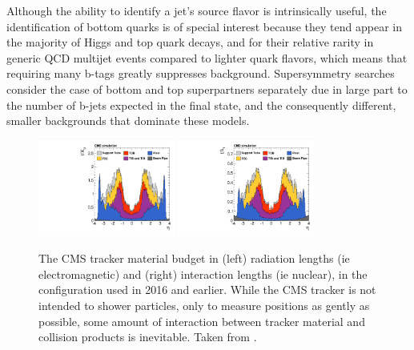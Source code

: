   Although the ability to identify a jet's source flavor is intrinsically useful, the identification of bottom quarks is of special interest because they tend appear in the majority of Higgs and top quark decays, and for their relative rarity in generic QCD multijet events compared to lighter quark flavors, which means that requiring many b-tags greatly suppresses background.
  Supersymmetry searches consider the case of bottom and top superpartners separately due in large part to the number of b-jets expected in the final state, and the consequently different, smaller backgrounds that dominate these models.

  \begin{figure}[h!]
    \centering
    \includegraphics[width=0.4\textwidth]{figures/MaterialBudget_RadLengths.pdf}
    \includegraphics[width=0.4\textwidth]{figures/MaterialBudget_InteractionLengths.pdf}
    \caption[Tracker material budget.]{
      The CMS tracker material budget in (left) radiation lengths (ie electromagnetic) and (right) interaction lengths (ie nuclear), in the configuration used in 2016 and earlier. 
      While the CMS tracker is not intended to shower particles, only to measure positions as gently as possible, some amount of interaction between tracker material and collision products is inevitable.
      Taken from \cite{cmstracking}.}
    \label{fig:trackerbudget}
  \end{figure}  

